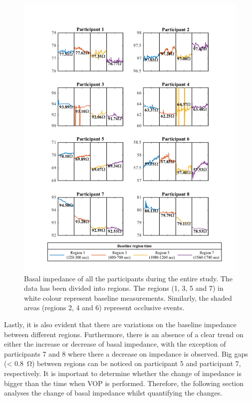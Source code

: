 \begin{figure}[!htbp]  %
	\includegraphics[width=\textwidth,keepaspectratio]{figure_b_3}    
	\caption[Measurements of the basal impedance during the whole study]{Basal impedance of all the participants during the entire study. The data has been divided into regions. The regions (1, 3, 5 and 7) in white colour represent baseline measurements. Similarly, the shaded areas (regions 2, 4 and 6) represent occlusive events.  }
	\label{fig:Basal Regions} 
\end{figure}

Lastly, it is also evident that there are variations on the baseline impedance between different regions. Furthermore, there is an absence of a clear trend on either the increase or decrease of basal impedance, with the exception of participants 7 and 8 where there a decrease on impedance is observed. Big gaps (< \SI{0.8}{\ohm}) between regions can be noticed on participant 5 and participant 7, respectively. It is important to determine whether the change of impedance is bigger than the time when VOP is performed. Therefore, the following section analyses the change of basal impedance whilst quantifying the changes. 


